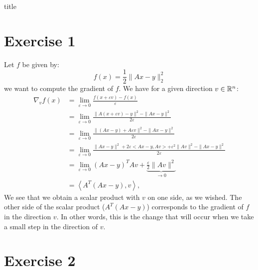 \documentclass[12pt]{article}
\begin{document}
{title}

\tableofcontents




\section{Exercise 1}

Let $f$ be given by:
\begin{equation}
  f(x) = \frac{1}{2} \| Ax - y \|_2^2
\end{equation}
we want to compute the gradient of $f$. We have for a given direction $v \in \mathbb{R}^n$:
\begin{align*}
  \nabla_v f(x)
   & =\lim_{\varepsilon \to 0} \frac{f(x+\varepsilon v)-f(x)}{\varepsilon}                                                      \\
   & =\lim_{\varepsilon \to 0} \frac{\|A(x+\varepsilon v)-y\|^2-\|A x-y\|^2}{2 \varepsilon}                                     \\
   & =\lim_{\varepsilon \to 0} \frac{\|(Ax - y) + A \varepsilon v \|^2-\|A x-y\|^2}{2 \varepsilon}                              \\
   & =\lim_{\varepsilon \to 0} \frac{\|A x-y\|^2+2 \varepsilon<A x-y, A v> + \varepsilon^2\|A v\|^2-\|A x-y\|^2}{2 \varepsilon} \\
   & =\lim_{\varepsilon \to 0}(A x-y)^T A v + \underbrace{\frac{\varepsilon}{2}\|A v\|^2}_{\to 0}                               \\
   & =\left\langle A^T(A x-y), v\right\rangle,
\end{align*}
We see that we obtain a scalar product with $v$ on one side, as we wished. The other side of the scalar product (\ie $A^T (Ax - y)$) corresponds to the gradient of $f$ in the direction $v$. In other words, this is the change that will occur when we take a small step in the direction of $v$.


\section{Exercise 2}
\end{document}
